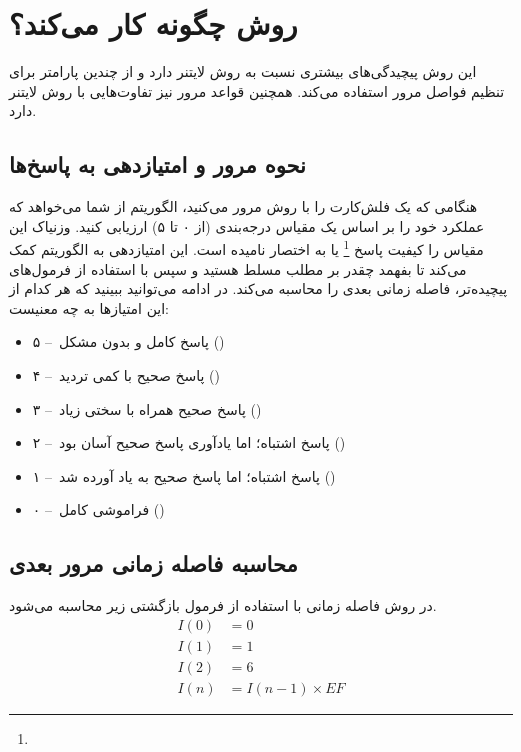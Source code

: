 \documentclass[12pt]{report}
\begin{document}
\section{روش  چگونه کار می‌کند؟}
این روش پیچیدگی‌های بیشتری نسبت به روش لایتنر دارد و از چندین پارامتر برای تنظیم فواصل مرور استفاده می‌کند.
همچنین قواعد مرور نیز تفاوت‌هایی با روش لایتنر دارد.
\subsection{نحوه مرور و امتیازدهی به پاسخ‌ها}
هنگامی که یک فلش‌کارت را با روش  
مرور می‌کنید، الگوریتم از شما می‌خواهد که عملکرد خود را بر اساس یک مقیاس درجه‌بندی 
(از ۰ تا ۵) 
ارزیابی کنید. وزنیاک این مقیاس را کیفیت پاسخ
\footnote{}
 یا به اختصار
 نامیده است.
 این امتیازدهی به الگوریتم کمک می‌کند تا بفهمد چقدر بر مطلب مسلط هستید و
سپس با استفاده از فرمول‌های پیچیده‌تر، 
فاصله زمانی بعدی را محاسبه می‌کند.
 در ادامه می‌توانید ببینید که هر کدام از این امتیازها به چه معنیست:

\begin{itemize}
    \item ۵ --~پاسخ کامل و بدون مشکل ()
    \item ۴ --~پاسخ صحیح با کمی تردید ()
    \item ۳ --~پاسخ صحیح همراه با سختی زیاد ()
    \item ۲ --~پاسخ اشتباه؛ اما یادآوری پاسخ صحیح آسان بود ()
    \item ۱ --~پاسخ اشتباه؛ اما پاسخ صحیح به یاد آورده شد ()
    \item ۰ --~فراموشی کامل ()
\end{itemize}

\subsection{محاسبه فاصله زمانی مرور بعدی}
در روش 
فاصله زمانی با استفاده از فرمول بازگشتی زیر محاسبه می‌شود.
\begin{align}
I(0) &= 0 \\
I(1) &= 1\label{eq:interval1} \\
I(2) &= 6 \\
I(n) &= I(n-1) \times EF\label{eq:interval}
\end{align}
\end{document}
